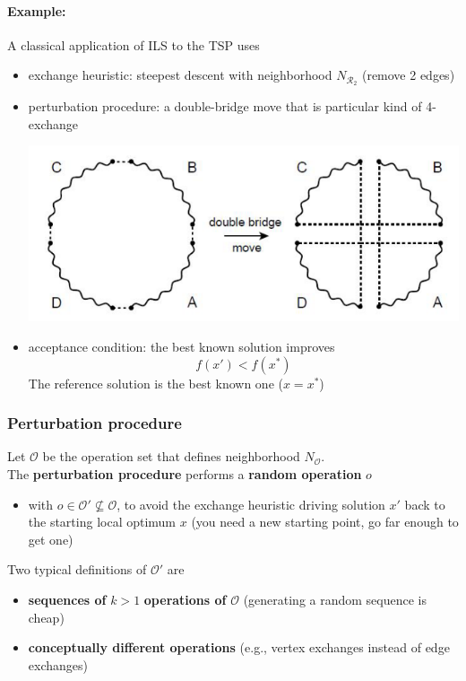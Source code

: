 \paragraph{Example:} A classical application of ILS to the TSP uses
\begin{itemize}
	\item exchange heuristic: steepest descent with neighborhood $N_{\mathcal{R}_2}$ (remove 2 edges)
	
	\item perturbation procedure: a double-bridge move that is particular kind of 4-exchange
	\begin{center}
		\includegraphics[width=0.6\columnwidth]{img/TSP5}
	\end{center}
	
	\item acceptance condition: the best known solution improves 
	$$f (x') < f (x^\ast)$$
	The reference solution is the best known one ($x = x^\ast$)
\end{itemize}

\newpage

\subsubsection{Perturbation procedure}

Let $\mathcal{O}$ be the operation set that defines neighborhood $N_{\mathcal{O}}$.\\

The \textbf{perturbation procedure} performs a \textbf{random operation} $o$
\begin{itemize}
	\item with $o \in \mathcal{O}' \not \subseteq \mathcal{O}$, to avoid the exchange heuristic driving solution $x'$ back to the starting local optimum $x$ (you need a new starting point, go far enough to get one)
\end{itemize}

Two typical definitions of $\mathcal{O}'$ are
\begin{itemize}
	\item \textbf{sequences of} $k > 1$ \textbf{operations of} $\mathcal{O}$ (generating a random sequence is cheap)
	
	\item \textbf{conceptually different operations} (e.g., vertex exchanges instead of edge exchanges)
\end{itemize}

